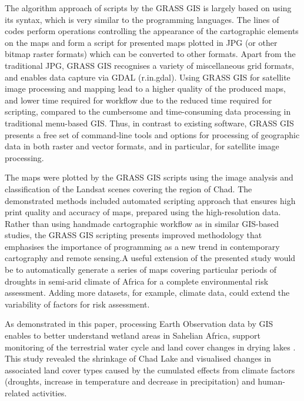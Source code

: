 \documentclass[geosciences,article,submit,pdftex,moreauthors]{Definitions/mdpi}
\begin{document}
The algorithm approach of scripts by the GRASS GIS is largely based on using its syntax, which is very similar to the programming languages. The lines of codes perform operations controlling the appearance of the cartographic elements on the maps and form a script for presented maps plotted in JPG (or other bitmap raster formats) which can be converted to other formats. Apart from the traditional JPG, GRASS GIS recognises a variety of miscellaneous grid formats, and enables data capture via GDAL (r.in.gdal). Using GRASS GIS for satellite image processing and mapping lead to a higher quality of the produced maps, and lower time required for workflow due to the reduced time required for scripting, compared to the cumbersome and time-consuming data processing in traditional menu-based GIS. Thus, in contrast to existing software, GRASS GIS presents a free set of command-line tools and options for processing of geographic data in both raster and vector formats, and in particular, for satellite image processing.

The maps were plotted by the GRASS GIS scripts using the image analysis and classification of the Landsat scenes covering the region of Chad. The demonstrated methods included automated scripting approach that ensures high print quality and accuracy of maps, prepared using the high-resolution data. Rather than using handmade cartographic workflow as in similar GIS-based studies, the GRASS GIS scripting presents improved methodology that emphasises the importance of programming as a new trend in contemporary cartography and remote sensing.A useful extension of the presented study would be to automatically generate a series of maps covering particular periods of droughts in semi-arid climate of Africa for a complete environmental risk assessment. Adding more datasets, for example, climate data, could extend the variability of factors for risk assessment.

As demonstrated in this paper, processing Earth Observation data by GIS enables to better understand wetland areas in Sahelian Africa, support monitoring of the terrestrial water cycle and land cover changes in drying lakes \cite{Jones}. This study revealed the shrinkage of Chad Lake and visualised changes in associated land cover types caused by the cumulated effects from climate factors (droughts, increase in temperature and decrease in precipitation) and human-related activities. 

\end{document}
